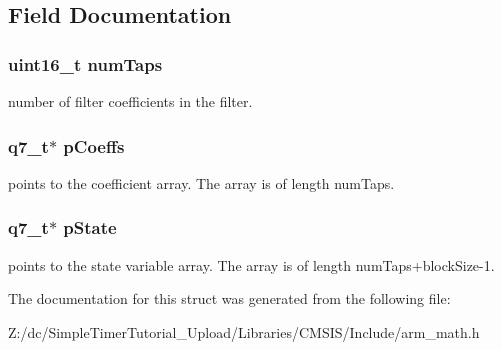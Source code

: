 \subsection{Field Documentation}
\hypertarget{structarm__fir__instance__q7_a751941891e47f522a7f5375fe8990aac}{
\subsubsection[{num\-Taps}]{\setlength{\rightskip}{0pt plus 5cm}uint16\-\_\-t num\-Taps}}\label{structarm__fir__instance__q7_a751941891e47f522a7f5375fe8990aac}
number of filter coefficients in the filter. \hypertarget{structarm__fir__instance__q7_a54407554b4fe7bbbb43924e4eea45e7f}{
\subsubsection[{p\-Coeffs}]{\setlength{\rightskip}{0pt plus 5cm}q7\-\_\-t$\ast$ p\-Coeffs}}\label{structarm__fir__instance__q7_a54407554b4fe7bbbb43924e4eea45e7f}
points to the coefficient array. The array is of length num\-Taps. \hypertarget{structarm__fir__instance__q7_aa8f67102521b620af6f259afdcf29785}{
\subsubsection[{p\-State}]{\setlength{\rightskip}{0pt plus 5cm}q7\-\_\-t$\ast$ p\-State}}\label{structarm__fir__instance__q7_aa8f67102521b620af6f259afdcf29785}
points to the state variable array. The array is of length num\-Taps+block\-Size-\/1. 

The documentation for this struct was generated from the following file\-:\begin{DoxyCompactItemize}
\item 
Z\-:/dc/\-Simple\-Timer\-Tutorial\-\_\-\-Upload/\-Libraries/\-C\-M\-S\-I\-S/\-Include/arm\-\_\-math.\-h\end{DoxyCompactItemize}
